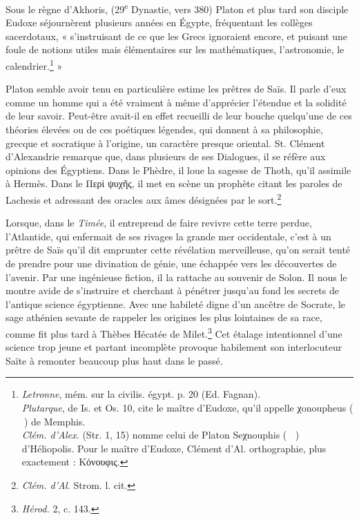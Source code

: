\documentclass[a4paper, 11pt, oneside]{article}
\newcommand*\hieroAABR{}
\newcommand*\hieroAACH{}
\newcommand*\hieroAADB{}
\newcommand*\hieroAAEB{}
\newcommand*\hieroAAFB{}
\newcommand*\hieroAALE{}
\newcommand*\hieroAALF{}
\begin{document}
Sous le règne d'Akhoris, (29\textsuperscript{e} Dynastie, vers 380) Platon et plus tard son disciple Eudoxe séjournèrent plusieurs années en Égypte, fréquentant les collèges sacerdotaux, « s'instruisant de ce que les Grecs ignoraient encore, et puisant une foule de notions utiles mais élémentaires sur les mathématiques, l'astronomie, le calendrier.\footnote{\emph{Letronne}, mém. sur la civilis. égypt. p. 20 (Ed. Fagnan).\\\hspace*{5mm}\emph{Plutarque}, de Is. et Os. 10, cite le maître d'Eudoxe, qu'il appelle χonoupheus ($\hieroAALE\:\hieroAAFB$) de Memphis.\\\hspace*{5mm}\emph{Clém. d'Alex.} (Str. 1, 15) nomme celui de Platon Seχnouphis ($\hieroAALF\:\hieroAACH\:\hieroAABR\allowbreak\:\hieroAADB\:\hieroAAEB$) d'Héliopolis. Pour le maître d'Eudoxe, Clément d'Al. orthographie, plus exactement : Κόνουφις.} »

Platon semble avoir tenu en particulière estime les prêtres de Saïs. Il parle d'eux comme un homme qui a été vraiment à même d'apprécier l'étendue et la solidité de leur savoir. Peut-être avait-il en effet recueilli de leur bouche quelqu'une de ces théories élevées ou de ces poétiques légendes, qui donnent à sa philosophie, grecque et socratique à l'origine, un caractère presque oriental. St. Clément d'Alexandrie remarque que, dans plusieurs de ses Dialogues, il se réfère aux opinions des Égyptiens. Dans le Phèdre, il loue la sagesse de Thoth, qu'il assimile à Hermès. Dans le Περὶ ψυχῆς, il met en scène un prophète citant les paroles de Lachesis et adressant des oracles aux âmes désignées par le sort.\footnote{\emph{Clém. d'Al.} Strom. l. cit.}

Lorsque, dans le \emph{Timée}, il entreprend de faire revivre cette terre perdue, l'Atlantide, qui enfermait de ses rivages la grande mer occidentale, c'est à un prêtre de Saïs qu'il dit emprunter cette révélation merveilleuse, qu'on serait tenté de prendre pour une divination de génie, une échappée vers les découvertes de l'avenir. Par une ingénieuse fiction, il la rattache au souvenir de Solon. Il nous le montre avide de s'instruire et cherchant à pénétrer jusqu'au fond les secrets de l'antique science égyptienne. Avec une habileté digne d'un ancêtre de Socrate, le sage athénien sevante de rappeler les origines les plus lointaines de sa race, comme fit plus tard à Thèbes Hécatée de Milet.\footnote{\emph{Hérod.} 2, c. 143.} Cet étalage intentionnel d'une science trop jeune et partant incomplète provoque habilement son interlocuteur Saïte à remonter beaucoup plus haut dans le passé.
\end{document}

